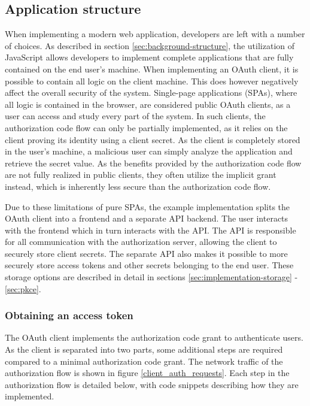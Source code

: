 \subsection{Application structure}

When implementing a modern web application, developers are left with a number of choices.
As described in section \ref{sec:background-structure}, the utilization of JavaScript allows developers to implement complete applications that are fully contained on the end user's machine.
When implementing an OAuth client, it is possible to contain all logic on the client machine.
This does however negatively affect the overall security of the system.
Single-page applications (SPAs), where all logic is contained in the browser, are considered public OAuth clients, as a user can access and study every part of the system.
In such clients, the authorization code flow can only be partially implemented, as it relies on the client proving its identity using a client secret.
As the client is completely stored in the user's machine, a malicious user can simply analyze the application and retrieve the secret value.
As the benefits provided by the authorization code flow are not fully realized in public clients, they often utilize the implicit grant instead, which is inherently less secure than the authorization code flow.

Due to these limitations of pure SPAs, the example implementation splits the OAuth client into a frontend and a separate API backend.
The user interacts with the frontend which in turn interacts with the API.
The API is responsible for all communication with the authorization server, allowing the client to securely store client secrets.
The separate API also makes it possible to more securely store access tokens and other secrets belonging to the end user.
These storage options are described in detail in sections \ref{sec:implementation-storage} - \ref{sec:pkce}.

\subsubsection{Obtaining an access token}
\label{sec:implementation:access-token}

The OAuth client implements the authorization code grant to authenticate users.
As the client is separated into two parts, some additional steps are required compared to a minimal authorization code grant.
The network traffic of the authorization flow is shown in figure \ref{client_auth_requests}.
Each step in the authorization flow is detailed below, with code snippets describing how they are implemented.

